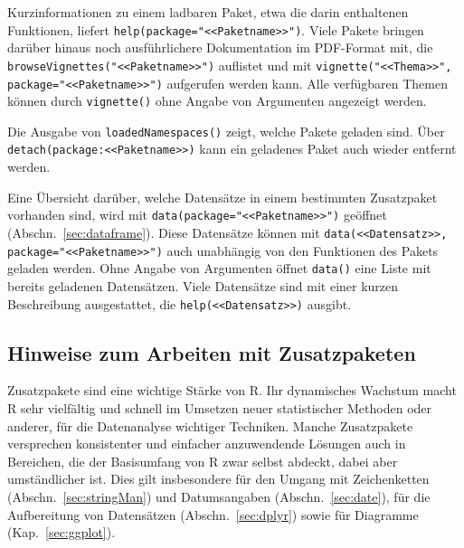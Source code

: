 Kurzinformationen zu einem ladbaren Paket, etwa die darin enthaltenen Funktionen, liefert \lstinline!help(package="<<Paketname>>")!. Viele Pakete bringen darüber hinaus noch ausführlichere Dokumentation im PDF-Format mit, die \lstinline!browseVignettes("<<Paketname>>")! auflistet und mit \lstinline!vignette("<<Thema>>", package="<<Paketname>>")! aufgerufen werden kann. Alle verfügbaren Themen können durch \lstinline!vignette()! ohne Angabe von Argumenten angezeigt werden.

Die Ausgabe von \lstinline!loadedNamespaces()! zeigt, welche Pakete geladen sind. Über \lstinline!detach(package:<<Paketname>>)! kann ein geladenes Paket auch wieder entfernt werden.

Eine Übersicht darüber, welche Datensätze in einem bestimmten Zusatzpaket vorhanden sind, wird mit
\lstinline!data(package="<<Paketname>>")! geöffnet (Abschn.\ \ref{sec:dataframe}). Diese Datensätze können mit \lstinline!data(<<Datensatz>>, package="<<Paketname>>")! auch unabhängig von den Funktionen des Pakets geladen werden. Ohne Angabe von Argumenten öffnet \lstinline!data()! eine Liste mit bereits geladenen Datensätzen. Viele Datensätze sind mit einer kurzen Beschreibung ausgestattet, die \lstinline!help(<<Datensatz>>)! ausgibt.

\subsection{Hinweise zum Arbeiten mit Zusatzpaketen}
\label{sec:packages_cave}

Zusatzpakete sind eine wichtige Stärke von R. Ihr dynamisches Wachstum macht R sehr vielfältig und schnell im Umsetzen neuer statistischer Methoden oder anderer, für die Datenanalyse wichtiger Techniken. Manche Zusatzpakete versprechen konsistenter und einfacher anzuwendende Lösungen auch in Bereichen, die der Basisumfang von R zwar selbst abdeckt, dabei aber umständlicher ist. Dies gilt insbesondere für den Umgang mit Zeichenketten (Abschn.\ \ref{sec:stringMan}) und Datumsangaben (Abschn.\ \ref{sec:date}), für die Aufbereitung von Datensätzen (Abschn.\ \ref{sec:dplyr}) sowie für Diagramme (Kap.\ \ref{sec:ggplot}).

